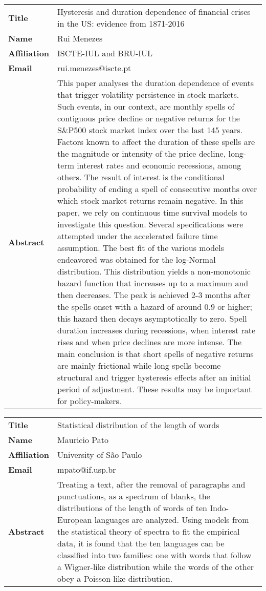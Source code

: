 \documentclass[oneside,A4paper,12pt]{article}
\begin{document}
\newpage
\begin{longtable}{p{2cm}p{14cm}}
\toprule
\textbf{Title} & Hysteresis and duration dependence of financial crises in the US: evidence from 1871-2016\\
\textbf{Name} & Rui Menezes\\
\textbf{Affiliation} & ISCTE-IUL and BRU-IUL\\
\textbf{Email} & rui.menezes@iscte.pt\\
\textbf{Abstract} & This paper analyses the duration dependence of events that trigger volatility persistence in stock markets. Such events, in our context, are monthly spells of contiguous price decline or negative returns for the S\&P500 stock market index over the last 145 years. Factors known to affect the duration of these spells are the magnitude or intensity of the price decline, long-term interest rates and economic recessions, among others. The result of interest is the conditional probability of ending a spell of consecutive months over which stock market returns remain negative. In this paper, we rely on continuous time survival models to investigate this question. Several specifications were attempted under the accelerated failure time assumption. The best fit of the various models endeavored was obtained for the log-Normal distribution. This distribution yields a non-monotonic hazard function that increases up to a maximum and then decreases. The peak is achieved 2-3 months after the spells onset with a hazard of around 0.9 or higher; this hazard then decays asymptotically to zero. Spell duration increases during recessions, when interest rate rises and when price declines are more intense. The main conclusion is that short spells of negative returns are mainly frictional while long spells become structural and trigger hysteresis effects after an initial period of adjustment. These results may be important for policy-makers.\\
\bottomrule
\end{longtable}

\newpage
\begin{longtable}{p{2cm}p{14cm}}
\toprule
\textbf{Title} & Statistical distribution of the length of words\\
\textbf{Name} & Mauricio Pato\\
\textbf{Affiliation} & University of São Paulo\\
\textbf{Email} & mpato@if.usp.br\\
\textbf{Abstract} & Treating a text, after the removal of paragraphs and punctuations, as a spectrum of blanks, the distributions of the length of words of ten Indo-European languages are analyzed. Using models from the statistical theory of spectra to fit the empirical data, it is found that the ten languages can be classified into two families: one with words that follow a Wigner-like distribution while the words of the other obey a Poisson-like distribution.\\
\bottomrule
\end{longtable}
\end{document}
